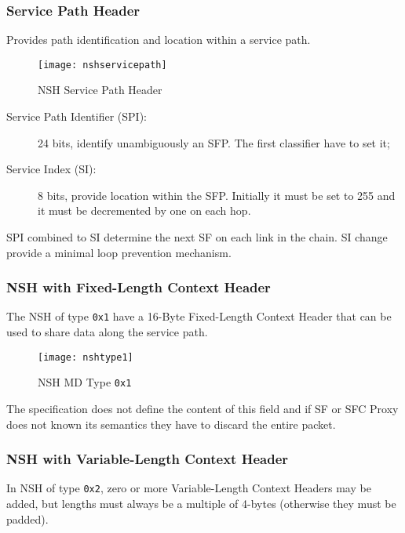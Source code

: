 \subsubsection{Service Path Header}
Provides path identification and location within a service path.

\begin{figure}[H]
  \centering
  \texttt{[image: nshservicepath]}
  \caption[NSH Service Path Header]{NSH Service Path Header~\cite{rfc8300}}
  \label{chap:background:img:nshpath}
\end{figure}

\begin{description}
  \item[Service Path Identifier (SPI):] 24 bits, identify unambiguously an SFP.
  The first classifier have to set it;
  \item[Service Index (SI):] 8 bits, provide location within the SFP. Initially
  it must be set to 255 and it must be decremented by one on each hop.
\end{description}

SPI combined to SI determine the next SF on each link in the chain. SI change
provide a minimal loop prevention mechanism.

\subsubsection{NSH with Fixed-Length Context Header}
\label{subsubsec:background:flch}
The NSH of type \texttt{0x1} have a 16-Byte Fixed-Length Context Header that
can be used to share data along the service path.

\begin{figure}[H]
  \centering
  \texttt{[image: nshtype1]}
  \caption[NSH MD Type \texttt{0x1}]{NSH MD Type \texttt{0x1}~\cite{rfc8300}}
  \label{chap:background:img:nshtype1}
\end{figure}

The specification does not define the content of this field and if SF or SFC
Proxy does not known its semantics they have to discard the entire packet. 

\subsubsection{NSH with Variable-Length Context Header}
\label{subsubsec:background:vlch}
In NSH of type \texttt{0x2}, zero or more Variable-Length Context Headers may
be added, but lengths must always be a multiple of 4-bytes (otherwise they must
be padded).


